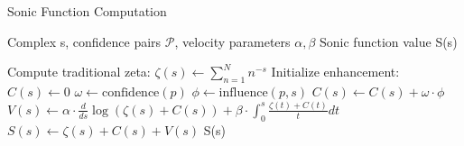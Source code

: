 \documentclass[12pt,a4paper]{article}
\begin{document}
\begin{algorithm}
\caption{Sonic Function Computation}
\begin{algorithmic}
\REQUIRE Complex s, confidence pairs $\mathcal{P}$, velocity parameters $\alpha, \beta$
\ENSURE Sonic function value S(s)

\STATE Compute traditional zeta: $\zeta(s) \leftarrow \sum_{n=1}^{N} n^{-s}$
\STATE Initialize enhancement: $C(s) \leftarrow 0$
    \STATE $\omega \leftarrow \text{confidence}(p)$
    \STATE $\phi \leftarrow \text{influence}(p, s)$
    \STATE $C(s) \leftarrow C(s) + \omega \cdot \phi$
\ENDFOR
\STATE $V(s) \leftarrow \alpha \cdot \frac{d}{ds} \log(\zeta(s) + C(s)) + \beta \cdot \int_0^s \frac{\zeta(t) + C(t)}{t} dt$
\STATE $S(s) \leftarrow \zeta(s) + C(s) + V(s)$
\RETURN S(s)
\end{algorithmic}
\end{algorithm}
\end{document}
